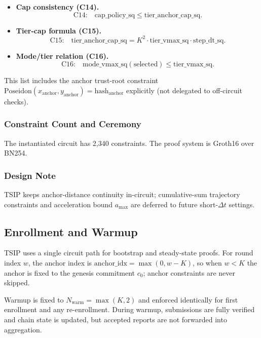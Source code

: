 \documentclass[conference]{IEEEtran}
\theoremstyle{definition}
\theoremstyle{plain}
\begin{document}
\begin{itemize}
\item \textbf{Cap consistency (C14).}
\[
\text{C14:}\quad
\mathrm{cap\_policy\_sq}\le \mathrm{tier\_anchor\_cap\_sq}.
\]

\item \textbf{Tier-cap formula (C15).}
\[
\text{C15:}\quad
\mathrm{tier\_anchor\_cap\_sq}
= K^2 \cdot \mathrm{tier\_vmax\_sq}\cdot \mathrm{step\_dt\_sq}.
\]

\item \textbf{Mode/tier relation (C16).}
\[
\text{C16:}\quad
\mathrm{mode\_vmax\_sq}(\mathrm{selected})
\le \mathrm{tier\_vmax\_sq}.
\]
\end{itemize}

This list includes the anchor trust-root constraint
$\mathrm{Poseidon}(x_{\mathrm{anchor}},y_{\mathrm{anchor}})=\mathrm{hash}_{\mathrm{anchor}}$
explicitly (not delegated to off-circuit checks).

\subsubsection{Constraint Count and Ceremony}

The instantiated circuit has 2{,}340 constraints.
The proof system is Groth16 over BN254.

\subsubsection{Design Note}

TSIP keeps anchor-distance continuity in-circuit; cumulative-sum
trajectory constraints and acceleration bound $a_{\max}$ are deferred to
future short-$\Delta t$ settings.

\subsection{Enrollment and Warmup}\label{sec:enrollment}

TSIP uses a single circuit path for bootstrap and steady-state proofs.
For round index $w$, the anchor index is
$\mathrm{anchor\_idx}=\max(0,w-K)$, so when $w<K$ the anchor is fixed to the
genesis commitment $c_0$; anchor constraints are never skipped.

Warmup is fixed to
$N_{\mathrm{warm}}=\max(K,2)$ and enforced identically for first enrollment
and any re-enrollment. During warmup, submissions are fully verified and
chain state is updated, but accepted reports are not forwarded into
aggregation.
\end{document}
